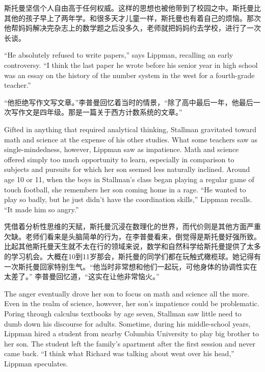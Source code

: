 \ifdefined\chs
斯托曼坚信个人自由高于任何权威。这样的思想也被他带到了校园之中。斯托曼比其他的孩子早上了两年学。和很多天才儿童一样，斯托曼也有着自己的烦恼。那次他帮妈妈解决完杂志上的数学题之后没多久，老师就把妈妈约去学校，进行了一次长谈。
\fi

\ifdefined\eng
``He absolutely refused to write papers,'' says Lippman, recalling an early controversy. ``I think the last paper he wrote before his senior year in high school was an essay on the history of the number system in the west for a fourth-grade teacher.''
\fi

\ifdefined\chs
``他拒绝写作文写文章。''李普曼回忆着当时的情景，``除了高中最后一年，他最后一次写作文是四年级。那是一篇关于西方计数系统的文章。''
\fi

\ifdefined\eng
Gifted in anything that required analytical thinking, Stallman gravitated toward math and science at the expense of his other studies. What some teachers saw as single-mindedness, however, Lippman saw as impatience. Math and science offered simply too much opportunity to learn, especially in comparison to subjects and pursuits for which her son seemed less naturally inclined. Around age 10 or 11, when the boys in Stallman's class began playing a regular game of touch football, she remembers her son coming home in a rage. ``He wanted to play so badly, but he just didn't have the coordination skills,'' Lippman recalls. ``It made him so angry.''
\fi

\ifdefined\chs
凭借着分析性思维的天赋，斯托曼沉浸在数理化的世界，而代价则是其他方面严重欠缺。老师们看来是头脑简单的行为，在李普曼看来，倒觉得是斯托曼好强所致。比起其他斯托曼天生就不太在行的领域来说，数学和自然科学给斯托曼提供了太多的学习机会。大概在10到11岁那会，斯托曼的同学们都在玩触式橄榄球。她记得有一次斯托曼回家特别生气。``他当时非常想和他们一起玩，可他身体的协调性实在太差了。'' 李普曼回忆道，``这实在让他非常恼火。''
\fi

\ifdefined\eng
The anger eventually drove her son to focus on math and science all the more. Even in the realm of science, however, her son's impatience could be problematic. Poring through calculus textbooks by age seven, Stallman saw little need to dumb down his discourse for adults. Sometime, during his middle-school years, Lippman hired a student from nearby Columbia University to play big brother to her son. The student left the family's apartment after the first session and never came back. ``I think what Richard was talking about went over his head,'' Lippman speculates.
\fi

